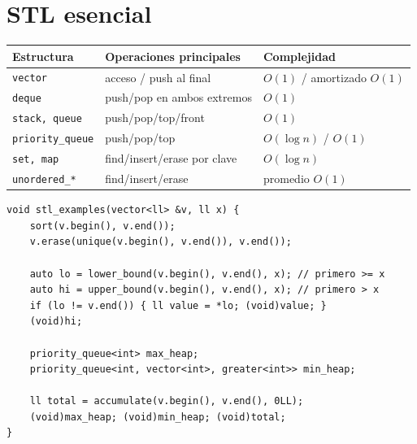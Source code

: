 \section{STL esencial}

\begin{center}
\begin{tabular}{lll}
Estructura & Operaciones principales & Complejidad \\
\hline
\texttt{vector} & acceso / push al final & $O(1)$ / amortizado $O(1)$ \\
\texttt{deque} & push/pop en ambos extremos & $O(1)$ \\
\texttt{stack, queue} & push/pop/top/front & $O(1)$ \\
\texttt{priority\_queue} & push/pop/top & $O(\log n)$ / $O(1)$ \\
\texttt{set, map} & find/insert/erase por clave & $O(\log n)$ \\
\texttt{unordered\_*} & find/insert/erase & promedio $O(1)$ \\
\end{tabular}
\end{center}

\begin{lstlisting}[style=cpp]
void stl_examples(vector<ll> &v, ll x) {
    sort(v.begin(), v.end());
    v.erase(unique(v.begin(), v.end()), v.end());

    auto lo = lower_bound(v.begin(), v.end(), x); // primero >= x
    auto hi = upper_bound(v.begin(), v.end(), x); // primero > x
    if (lo != v.end()) { ll value = *lo; (void)value; }
    (void)hi;

    priority_queue<int> max_heap;
    priority_queue<int, vector<int>, greater<int>> min_heap;

    ll total = accumulate(v.begin(), v.end(), 0LL);
    (void)max_heap; (void)min_heap; (void)total;
}
\end{lstlisting}


